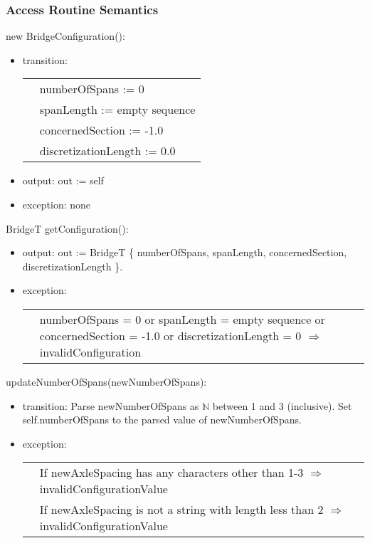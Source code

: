 \documentclass[12pt, titlepage]{article}
\begin{document}
\subsubsection{Access Routine Semantics}

\noindent new BridgeConfiguration():
\begin{itemize}
\item transition:\\
        \begin{tabular}{p{1cm} p{8cm}}
        & numberOfSpans := 0\\
	& spanLength := empty sequence\\
	& concernedSection := -1.0\\
	& discretizationLength := 0.0\\
        \end{tabular}
\item output: out := self
\item exception: none
\end{itemize}

\noindent BridgeT getConfiguration():
\begin{itemize}
\item output: out := BridgeT \{ numberOfSpans, spanLength, concernedSection, discretizationLength \}.
\item exception:\\
    \begin{tabular}{p{1cm}p{15cm}}
    & numberOfSpans = 0 or spanLength = empty sequence or concernedSection = -1.0 or discretizationLength = 0 $\Rightarrow$ invalidConfiguration\\
    \end{tabular}
\end{itemize}

\noindent updateNumberOfSpans(newNumberOfSpans):
\begin{itemize}
\item transition: Parse newNumberOfSpans as $\mathbb{N}$ between 1 and 3 (inclusive). Set self.numberOfSpans to the parsed value of newNumberOfSpans.
\item exception:\\
    \begin{tabular}{p{1cm} p{16cm}}
    & If newAxleSpacing has any characters other than 1-3 $\Rightarrow$ invalidConfigurationValue\\
    & If newAxleSpacing is not a string with length less than 2 $\Rightarrow$ invalidConfigurationValue\\
    \end{tabular}
\end{itemize}
\end{document}
